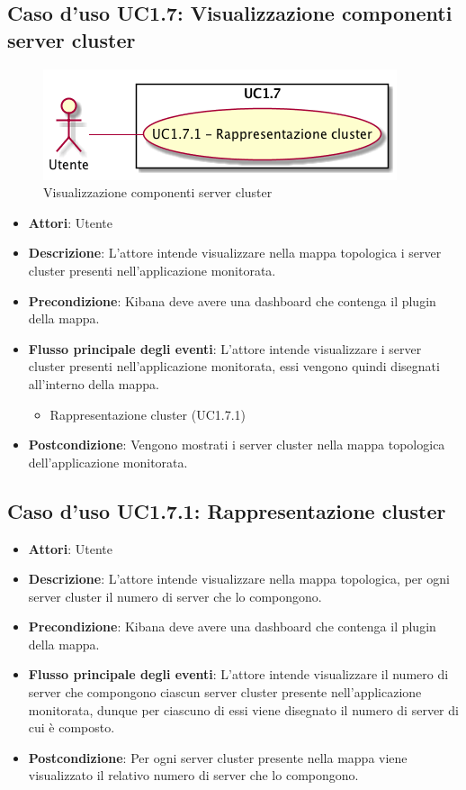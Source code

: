 \subsection{Caso d'uso UC1.7: Visualizzazione componenti server cluster}
\begin{figure} [H]
	\centering
	\includegraphics[scale=0.45]{./UC/UC1-7.png}
	\caption{Visualizzazione componenti server cluster}\label{}
\end{figure}
\begin{itemize}
	\item \textbf{Attori}: Utente
	\item \textbf{Descrizione}: L'attore intende visualizzare nella mappa topologica i server cluster presenti nell'applicazione monitorata.
	\item \textbf{Precondizione}: Kibana deve avere una dashboard che contenga il plugin della mappa.
	\item \textbf{Flusso principale degli eventi}: L'attore intende visualizzare i server cluster presenti nell'applicazione monitorata, essi vengono quindi disegnati all'interno della mappa.
	\begin{itemize}
		\item Rappresentazione cluster (UC1.7.1)
	\end{itemize}
	\item \textbf{Postcondizione}: Vengono mostrati i server cluster nella mappa topologica dell'applicazione monitorata.
\end{itemize}
\subsection{Caso d'uso UC1.7.1: Rappresentazione cluster}
\begin{itemize}
	\item \textbf{Attori}: Utente
	\item \textbf{Descrizione}: L'attore intende visualizzare nella mappa topologica, per ogni server cluster il numero di server che lo compongono.
	\item \textbf{Precondizione}: Kibana deve avere una dashboard che contenga il plugin della mappa.
	\item \textbf{Flusso principale degli eventi}: L'attore intende visualizzare il numero di server che compongono ciascun server cluster presente nell'applicazione monitorata, dunque per ciascuno di essi viene disegnato il numero di server di cui è composto.
	\item \textbf{Postcondizione}: Per ogni server cluster presente nella mappa viene visualizzato il relativo numero di server che lo compongono.
\end{itemize}
